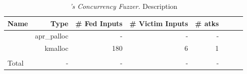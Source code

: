 \begin{table}[ht!]
	\footnotesize
	\centering
	\begin{tabular}{l|r|r|r|r|r|r|r}
		{\bf Name} & {\bf Type} & {\bf \# Fed Inputs}& {\bf \# Victim Inputs} & {\bf \# atks}  \\
		\hline
		\apache    &   apr\_palloc   &  -   &  -  & -  \\
		\linux     &  kmalloc  & 180   &  6  &  1   \\
		\hline\\[-2.3ex]
		Total      &    -     &  -  & -  & -\\
	\end{tabular}
	\vspace{-.1in}
	\caption{{\em \xxx's Concurrency Fuzzer.} \rm {Description}} 
	\label{tab:fuzzer}
	\vspace{-.2in}
\end{table}


